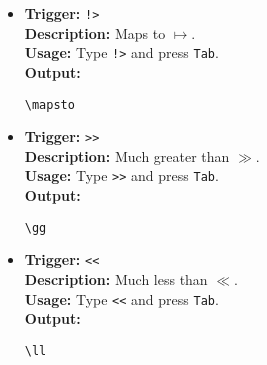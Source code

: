 \documentclass{article}
\begin{document}
\begin{itemize}[leftmargin=*, label={}]
\item \textbf{Trigger:} \texttt{!>} \\
\textbf{Description:} Maps to \(\mapsto\). \\
\textbf{Usage:} Type \texttt{!>} and press \texttt{Tab}. \\
\textbf{Output:}
\begin{verbatim}
\mapsto 
\end{verbatim}

\item \textbf{Trigger:} \texttt{>>} \\
\textbf{Description:} Much greater than \(\gg\). \\
\textbf{Usage:} Type \texttt{>>} and press \texttt{Tab}. \\
\textbf{Output:}
\begin{verbatim}
\gg 
\end{verbatim}

\item \textbf{Trigger:} \texttt{<<} \\
\textbf{Description:} Much less than \(\ll\). \\
\textbf{Usage:} Type \texttt{<<} and press \texttt{Tab}. \\
\textbf{Output:}
\begin{verbatim}
\ll 
\end{verbatim}
\end{itemize}
\end{document}
